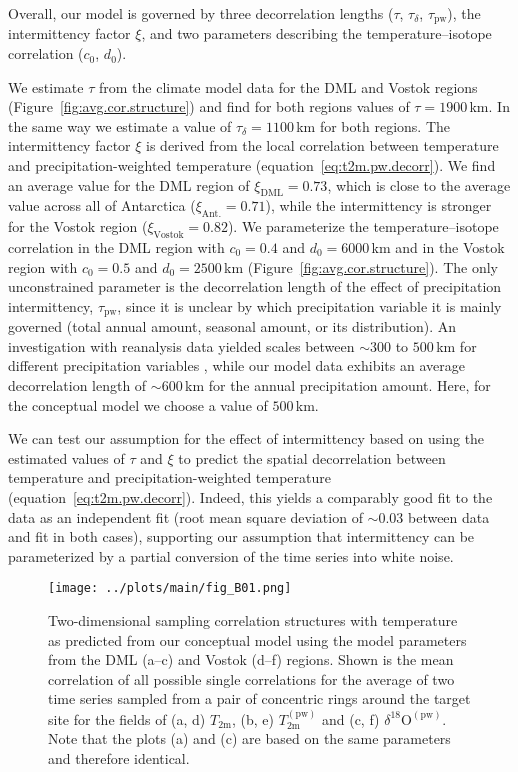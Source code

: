 \documentclass[draft]{agujournal2019}
\begin{document}
Overall, our model is governed by three decorrelation lengths ($\tau$,
$\tau_{\delta}$, $\tau_{\mathrm{pw}}$), the intermittency factor $\xi$, and two
parameters describing the temperature--isotope correlation ($c_0$, $d_0$).

We estimate $\tau$ from the climate model data for the DML and Vostok regions
(Figure~\ref{fig:avg.cor.structure}) and find for both regions values of
$\tau=1900$\,km. In the same way we estimate a value of $\tau_{\delta}=1100$\,km
for both regions. The intermittency factor $\xi$ is derived from the local
correlation between temperature and precipitation-weighted temperature
(equation~\ref{eq:t2m.pw.decorr}). We find an average value for the DML region
of $\xi_{\mathrm{DML}}=0.73$, which is close to the average value across all of
Antarctica ($\xi_{\mathrm{Ant.}}=0.71$), while the intermittency is stronger for
the Vostok region ($\xi_{\mathrm{Vostok}}=0.82$). We parameterize the
temperature--isotope correlation in the DML region with $c_0=0.4$ and
$d_0=6000$\,km and in the Vostok region with $c_0=0.5$ and $d_0=2500$\,km
(Figure~\ref{fig:avg.cor.structure}). The only unconstrained parameter is the
decorrelation length of the effect of precipitation intermittency,
$\tau_{\mathrm{pw}}$, since it is unclear by which precipitation variable it is
mainly governed (total annual amount, seasonal amount, or its distribution). An
investigation with reanalysis data yielded scales between $\sim300$ to $500$\,km
for different precipitation variables \cite{Munch2018a}, while our model data
exhibits an average decorrelation length of $\sim600$\,km for the annual
precipitation amount. Here, for the conceptual model we choose a value of
$500$\,km.

We can test our assumption for the effect of intermittency based on using the
estimated values of $\tau$ and $\xi$ to predict the spatial decorrelation
between temperature and precipitation-weighted temperature
(equation~\ref{eq:t2m.pw.decorr}). Indeed, this yields a comparably good fit to
the data as an independent fit (root mean square deviation of $\sim0.03$ between
data and fit in both cases), supporting our assumption that intermittency can be
parameterized by a partial conversion of the time series into white noise.

\begin{figure*}[t]%
\centering
\texttt{[image: ../plots/main/fig\_B01.png]}
\caption{%
  Two-dimensional sampling correlation structures with temperature as predicted
  from our conceptual model using the model parameters from the DML
  (a--c) and Vostok (d--f) regions. Shown is the mean correlation of all
  possible single correlations for the average of two time series sampled from a
  pair of concentric rings around the target site for the fields of (a, d)
  $T_{\mathrm{2m}}$, (b, e) $T_{\mathrm{2m}}^{\mathrm{(pw)}}$ and (c, f)
  $\delta^{18}\mathrm{O}^{\mathrm{(pw)}}$. Note that the plots (a) and (c) are
  based on the same parameters and therefore identical.}
\label{fig:conceptual.model}%
\end{figure*}%
\end{document}
